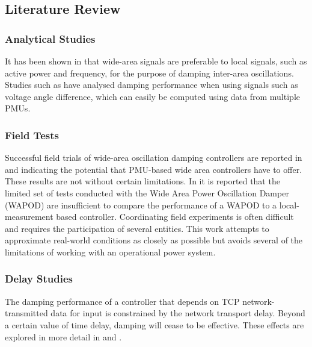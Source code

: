 \documentclass[journal]{IEEEtran}
\begin{document}
\subsection{Literature Review}

\subsubsection*{Analytical Studies}

It has been shown in \cite{Yuwa} that wide-area signals are preferable to local signals, such as active power and frequency, \cite{localREMcomparison} for the purpose of damping inter-area oscillations. Studies such as \cite{Yuwa} have analysed damping performance when using signals such as voltage angle difference, which can easily be computed using data from multiple PMUs.

\subsubsection*{Field Tests}
Successful field trials of wide-area oscillation damping controllers are reported in \cite{WAPODNorway} and \cite{WAPODChina} indicating the potential that PMU-based wide area controllers have to offer. These results are not without certain limitations. In \cite{WAPODNorway} it is reported that the limited set of tests conducted with the Wide Area Power Oscillation Damper (WAPOD) are insufficient to compare the performance of a WAPOD to a local-measurement based controller. Coordinating field experiments is often difficult and requires the participation of several entities. This work attempts to approximate real-world conditions as closely as possible but avoids several of the limitations of working with an operational power system.

\subsubsection*{Delay Studies} The damping performance of a controller that depends on TCP network-transmitted data for input is constrained by the network transport delay. Beyond a certain value of time delay, damping will cease to be effective. These effects are explored in more detail in \cite{China_paper} and \cite{Biplab}.\vspace{-1em}
\end{document}
